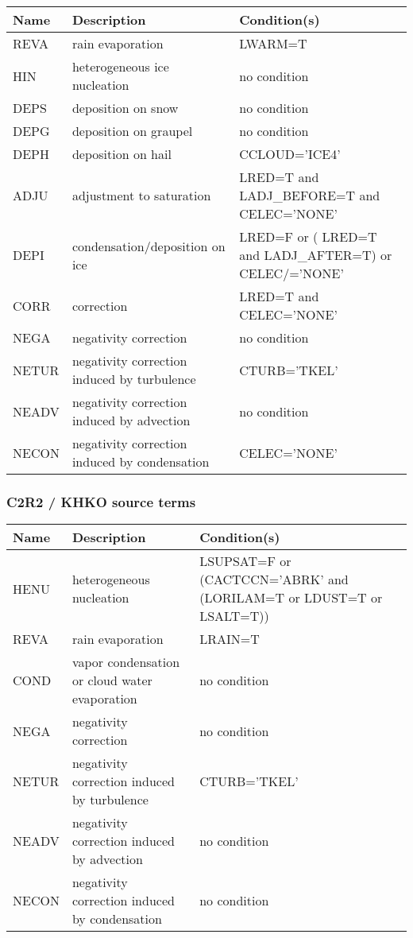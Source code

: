 \begin{longtable} {|p{}|p{}|p{}|}
\hline
Name & Description & Condition(s) \\
\hline \hline
\endhead
REVA   & rain evaporation                              & LWARM=T \\\hline
HIN    & heterogeneous ice nucleation                  & no condition \\\hline
DEPS   & deposition on snow                            & no condition \\\hline
DEPG   & deposition on graupel                         & no condition \\\hline
DEPH   & deposition on hail                            & CCLOUD='ICE4' \\\hline
ADJU   & adjustment to saturation                      & LRED=T and LADJ\_BEFORE=T and CELEC='NONE' \\\hline
DEPI   & condensation/deposition on ice                & LRED=F or ( LRED=T and LADJ\_AFTER=T) or CELEC/='NONE' \\\hline
CORR   & correction                                    & LRED=T and CELEC='NONE' \\\hline
NEGA   & negativity correction                         & no condition \\\hline
NETUR  & negativity correction induced by turbulence   & CTURB='TKEL' \\\hline
NEADV  & negativity correction induced by advection    & no condition \\\hline
NECON  & negativity correction induced by condensation & CELEC='NONE' \\\hline
\end{longtable}

\subsubsection{C2R2 / KHKO source terms}

\begin{longtable} {|p{}|p{}|p{}|}
\hline
Name & Description & Condition(s) \\
\hline \hline
\endhead
HENU   & heterogeneous nucleation                      & LSUPSAT=F or (CACTCCN='ABRK' and (LORILAM=T or LDUST=T or LSALT=T)) \\\hline
REVA   & rain evaporation                              & LRAIN=T \\\hline
COND   & vapor condensation or cloud water evaporation & no condition \\\hline
NEGA   & negativity correction                         & no condition \\\hline
NETUR  & negativity correction induced by turbulence   & CTURB='TKEL' \\\hline
NEADV  & negativity correction induced by advection    & no condition \\\hline
NECON  & negativity correction induced by condensation & no condition \\\hline
\end{longtable}

